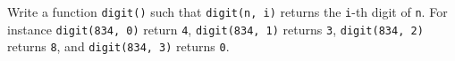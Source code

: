 Write a function \texttt{digit()} such that \texttt{digit(n, i)} returns the \texttt{i}-th digit of \texttt{n}. For instance \texttt{digit(834, 0)} return \texttt{4}, \texttt{digit(834, 1)} returns \texttt{3}, \texttt{digit(834, 2)} returns \texttt{8}, and \texttt{digit(834, 3)} returns \texttt{0}.

